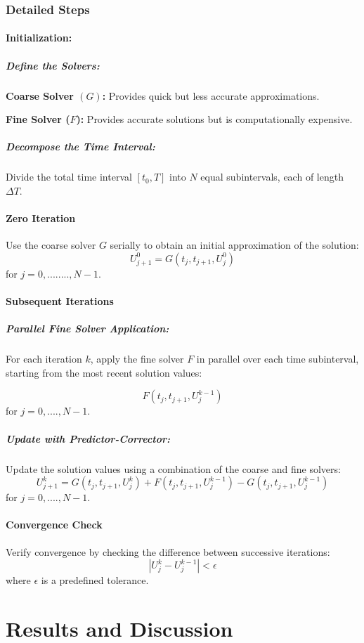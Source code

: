 \documentclass{article}
\begin{document}
   \subsubsection{Detailed Steps}
   
   \paragraph{Initialization:} 
     \subparagraph{Define the Solvers:}
     
     
        \textbf{Coarse Solver $(G)$:} Provides quick but less accurate approximations.
        
        \textbf{Fine Solver ($F$):} Provides accurate solutions but is computationally expensive.
        
     \subparagraph{Decompose the Time Interval:}
      Divide the total time interval 
   $[t_0,T]$ into
   $N$ equal subintervals, each of length 
   $\Delta T$. 
   \paragraph{Zero Iteration}
   Use the coarse solver $G$ serially to obtain an initial approximation of the solution:
    $$ U_{j+1}^0 = G(t_j,t_{j+1}, U_j^0)$$   for $j = 0, ........, N-1$.
   \paragraph{Subsequent Iterations} 
       \subparagraph{Parallel Fine Solver Application:} 
           For each iteration $k$, apply the fine solver $F$ in parallel over each time subinterval, starting from the most recent solution values:
   
   $$ F(t_j,t_{j+1}, U_j^{k-1})$$ for $j = 0, ....,N-1$.
        \subparagraph{Update with Predictor-Corrector:}
        Update the solution values using a combination of the coarse and fine solvers:
        $$ U_{j+1}^k = G(t_j,t_{j+1},U_j^k) + F(t_j,t_{j+1},U_j^{k-1}) -G(t_j,t_{j+1},U_j^{k-1})$$
        for $j = 0, .... ,N-1$.
        
    \paragraph{Convergence Check}
        Verify convergence by checking the difference between successive iterations:
      $$   | U_j^k - U_j^{k-1} | < \epsilon $$
   where $ \epsilon $ is a predefined tolerance. \cite{pararealwikipedia}

\section{Results and Discussion}
\end{document}
